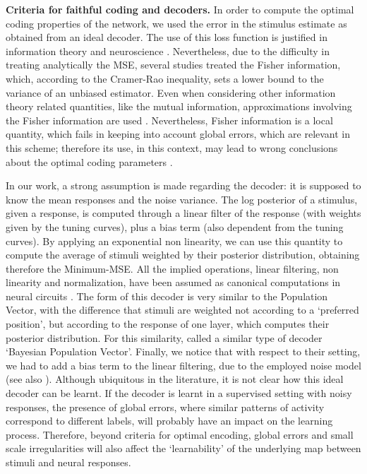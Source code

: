 \documentclass[a4paper]{article}
\begin{document}
\textbf{Criteria for faithful coding and decoders.} In order to compute the optimal coding properties of the network, we used the error in the stimulus estimate as obtained from an ideal decoder.  The use of this loss function is justified in information theory \cite[]{Cover2005ElementsTheory} and neuroscience \cite[]{Dayan2001TheoreticalSystems, Salinas1994VectorRates}. Nevertheless, due to the difficulty in treating analytically the MSE, several studies treated the Fisher information, which, according to the Cramer-Rao inequality, sets a lower bound to the variance of an unbiased estimator. Even when considering other information theory related quantities, like the mutual information, approximations involving the Fisher information are used \cite[]{Brunel1998MutualCoding,Wei2016MutualCoding,Huang2019ApproximationsCoding}. Nevertheless, Fisher information is a local quantity, which fails in keeping into account global errors, which are relevant in this scheme; therefore its use, in this context, may lead to wrong conclusions about the optimal coding parameters \cite[]{Bethge2002OptimalFails,Berens2011ReassessingFunctions,Yaeli2010Error-basedNeurons}. 

In our work, a strong assumption is made regarding the decoder: it is supposed to know the mean responses and the noise variance. The log posterior of a stimulus, given a response, is computed through a linear filter of the response (with weights given by the tuning curves), plus a bias term (also dependent from the tuning curves). By applying an exponential non linearity,  we can use this quantity to compute the average of stimuli weighted by their posterior distribution, obtaining therefore the Minimum-MSE.
All the implied operations,  linear filtering, non linearity and normalization, have been assumed as canonical computations in neural circuits \cite[]{Deneve1999ReadingObservers,Carandini2012NormalizationComputation,Kouh2008AOperations}. The form of this decoder is very similar to the Population Vector,  with the difference that stimuli are weighted not according to a `preferred position', but according to the response of one layer, which computes their posterior distribution. For this similarity, \cite{Ganguli2014EfficientPopulations} called a similar type of decoder `Bayesian Population Vector'. Finally, we notice that with respect to their setting, we had to add a  bias term to the linear filtering, due to the employed noise model  (see also \cite{Ma2006BayesianCodes,Jazayeri2006OptimalPopulations}).
Although ubiquitous in the literature, it is not clear how this ideal decoder can be learnt.  If the decoder is learnt in a supervised setting with noisy responses, the presence of global errors, where similar patterns of activity correspond to different labels, will probably  have an impact on the learning process. Therefore, beyond criteria for optimal encoding, global errors and small scale irregularities will also affect the `learnability' of the underlying map between stimuli and neural responses.
\end{document}
